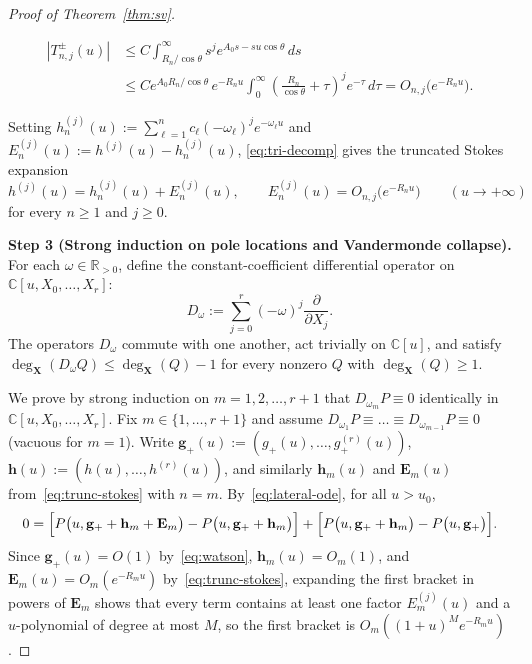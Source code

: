 \documentclass[10pt,reqno]{amsart}
\numberwithin{equation}{section}
\theoremstyle{definition}
\newcommand{\R}{\mathbb{R}}
\newcommand{\C}{\mathbb{C}}
\begin{document}
\begin{proof}[Proof of Theorem~\ref{thm:sv}]
\begin{itemize}
\begin{align*}
    |T_{n,j}^\pm(u)|
    &\le C \int_{R_n/\cos\theta}^\infty s^j e^{A_0 s - s u \cos\theta}\,ds \\
    &\le C e^{A_0 R_n/\cos\theta}\, e^{-R_n u} \int_0^\infty \left(\frac{R_n}{\cos\theta} + \tau\right)^j e^{-\tau}\,d\tau
    = O_{n,j}\bigl(e^{-R_n u}\bigr).
  \end{align*}
\end{itemize}
Setting $h_n^{(j)}(u) := \sum_{\ell=1}^n c_\ell (-\omega_\ell)^j e^{-\omega_\ell u}$ and $E_n^{(j)}(u) := h^{(j)}(u) - h_n^{(j)}(u)$, \eqref{eq:tri-decomp} gives the truncated Stokes expansion
\begin{equation}\label{eq:trunc-stokes}
  h^{(j)}(u) = h_n^{(j)}(u) + E_n^{(j)}(u), \qquad E_n^{(j)}(u) = O_{n,j}\bigl(e^{-R_n u}\bigr) \qquad (u \to +\infty)
\end{equation}
for every $n \ge 1$ and $j \ge 0$.

\smallskip
\noindent\textbf{Step 3 (Strong induction on pole locations and Vandermonde collapse).}
For each $\omega \in \R_{>0}$, define the constant-coefficient differential operator on $\C[u, X_0, \dots, X_r]$:
\[
  D_\omega := \sum_{j=0}^r (-\omega)^j \frac{\partial}{\partial X_j}.
\]
The operators $D_\omega$ commute with one another, act trivially on $\C[u]$, and satisfy $\deg_{\mathbf{X}}(D_\omega Q) \le \deg_{\mathbf{X}}(Q) - 1$ for every nonzero $Q$ with $\deg_{\mathbf{X}}(Q) \ge 1$.

We prove by strong induction on $m = 1, 2, \dots, r + 1$ that $D_{\omega_m} P \equiv 0$ identically in $\C[u, X_0, \dots, X_r]$. Fix $m \in \{1, \dots, r+1\}$ and assume $D_{\omega_1} P \equiv \dots \equiv D_{\omega_{m-1}} P \equiv 0$ (vacuous for $m = 1$). Write $\mathbf{g}_+(u) := (g_+(u), \dots, g_+^{(r)}(u))$, $\mathbf{h}(u) := (h(u), \dots, h^{(r)}(u))$, and similarly $\mathbf{h}_m(u)$ and $\mathbf{E}_m(u)$ from~\eqref{eq:trunc-stokes} with $n = m$. By~\eqref{eq:lateral-ode}, for all $u > u_0$,
\begin{equation}\label{eq:split-P}
  0 = \Bigl[P\bigl(u, \mathbf{g}_+ + \mathbf{h}_m + \mathbf{E}_m\bigr) - P\bigl(u, \mathbf{g}_+ + \mathbf{h}_m\bigr)\Bigr]
  + \Bigl[P\bigl(u, \mathbf{g}_+ + \mathbf{h}_m\bigr) - P\bigl(u, \mathbf{g}_+\bigr)\Bigr].
\end{equation}
Since $\mathbf{g}_+(u) = O(1)$ by~\eqref{eq:watson}, $\mathbf{h}_m(u) = O_m(1)$, and $\mathbf{E}_m(u) = O_m(e^{-R_m u})$ by~\eqref{eq:trunc-stokes}, expanding the first bracket in powers of $\mathbf{E}_m$ shows that every term contains at least one factor $E_m^{(j)}(u)$ and a $u$-polynomial of degree at most $M$, so the first bracket is $O_m((1+u)^M e^{-R_m u})$.


\end{proof}
\end{document}
